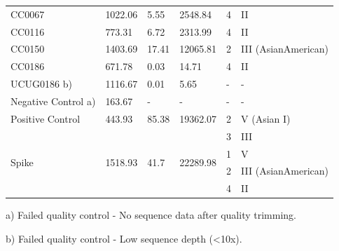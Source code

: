 \begin{table}[h!]
{\begin{tabular}{@{}llllll@{}}
CC0067                & 1022.06 & 5.55  & 2548.84  & 4 & II                  \\
CC0116                & 773.31  & 6.72  & 2313.99  & 4 & II                  \\
CC0150                & 1403.69 & 17.41 & 12065.81 & 2 & III (AsianAmerican) \\
CC0186                & 671.78  & 0.03  & 14.71    & 4 & II                  \\
UCUG0186   b)         & 1116.67 & 0.01  & 5.65     & - & -                   \\
Negative   Control a) & 163.67  & -     & -        & - & -                   \\
Positive   Control     & 443.93                   & 85.38                 & 19362.07                           & 2        & V (Asian I) \\
\multirow{4}{*}{Spike} & \multirow{4}{*}{1518.93} & \multirow{4}{*}{41.7} & \multirow{4}{*}{22289.98}          & 3        & III         \\
                      &         &       &          & 1 & V                   \\
                      &         &       &          & 2 & III (AsianAmerican) \\
                      &         &       &          & 4 & II                 
\end{tabular}%
}
\item a) Failed quality control - No sequence data after quality trimming.
\item b) Failed quality control - Low sequence depth (<10x).
\end{table}

\newpage

